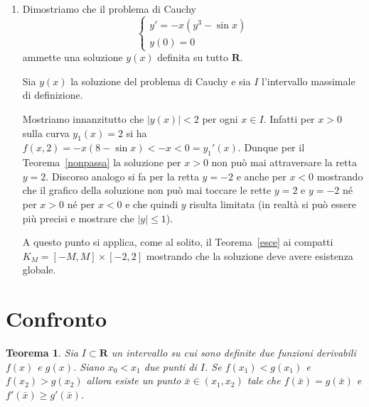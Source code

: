 \documentclass[italian,a4paper]{article}
\newcommand{\R}{\mathbf{R}}
\newtheorem{theorem}{Teorema}[section]
\begin{document}
\begin{enumerate}
Nel punto $x=\bar x$ la soluzione $y(x)$ attraversa la curva
$y_0(x)$. Infatti in tale punto $y'(\bar x)=0$ mentre $y_0'(\bar
x)<0$. Dunque in un intorno destro di $\bar x$ la soluzione si trova
al di sopra della curva $y_0(x)$ e quindi risulta essere decrescente
(in $\bar x$ la soluzione presenta un massimo relativo).

Il Teorema~\ref{nonpassa} ci garantisce inoltre che la soluzione non
pu\`o pi\`u riattraversare il grafico della funzione $y_0$ in quanto
$y'_0<0$. Dunque la soluzione \`e decrescente e limitata. Applicando,
al solito, il Teorema~\ref{esce} si pu\`o quindi mostrare che la
soluzione massimale \`e definita per ogni $x>0$.

Un ragionamento analogo si fa per $x<0$ ottenendo l'esistenza globale,
su tutto $\R$ della soluzione.


\item
Dimostriamo che il problema di Cauchy
\[
\left\{\begin{array}{l}
	y' = -x(y^3 - \sin x) \\
	y(0) = 0
	\end{array}\right.
\]
ammette una soluzione $y(x)$ definita su tutto $\R$. 

Sia $y(x)$ la soluzione del problema di Cauchy e sia $I$ l'intervallo
massimale di definizione. 

Mostriamo innanzitutto che $\vert y(x) \vert < 2$ per ogni $x\in
I$. Infatti per $x>0$ sulla curva $y_1(x)=2$ si ha $f(x,2) = -x
(8-\sin x) < -x < 0 = y_1'(x)$. Dunque per il Teorema~\ref{nonpassa} la
soluzione per $x>0$ non pu\`o mai attraversare la retta
$y=2$. Discorso analogo si fa per la retta $y=-2$ e anche per $x<0$
mostrando che il grafico della  soluzione non pu\`o mai toccare le
rette $y=2$ e $y=-2$ n\'e per $x>0$ n\'e per $x<0$ 
e che quindi $y$ risulta limitata (in realt\`a si
pu\`o essere pi\`u precisi e mostrare che $\vert y\vert \le 1$).

A questo punto si applica, come al solito, il Teorema~\ref{esce} ai
compatti $K_M=[-M,M]\times[-2,2]$ mostrando che la soluzione deve
avere esistenza globale.
\end{enumerate}

\section{Confronto}

\begin{theorem}
Sia $I\subset \R$ un intervallo su cui sono definite due funzioni derivabili
$f(x)$ e $g(x)$. 
Siano $x_0<x_1$ due punti di $I$. Se $f(x_1)<g(x_1)$ e $f(x_2)>g(x_2)$
allora esiste un punto $\bar x \in (x_1,x_2)$ tale che $f(\bar
x)=g(\bar x)$ e $f'(\bar x)\ge g'(\bar x)$.
\end{theorem}
\end{document}
